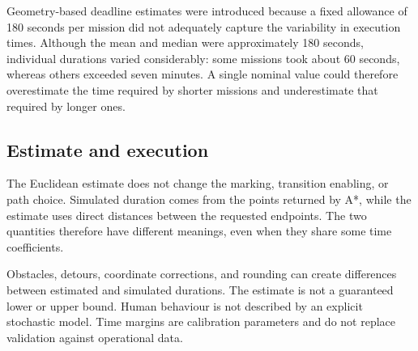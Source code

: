 \begin{nota}
	Geometry-based deadline estimates were introduced because a fixed
	allowance of 180 seconds per mission did not adequately capture
	the variability in execution times. Although the mean and median
	were approximately 180 seconds, individual durations varied
	considerably: some missions took about 60 seconds, whereas others
	exceeded seven minutes. A single nominal value could therefore
	overestimate the time required by shorter missions and underestimate
	that required by longer ones.
\end{nota}

\subsection{Estimate and execution}

The Euclidean estimate does not change the marking, transition enabling, or
path choice. Simulated duration comes from the points returned by A*, while
the estimate uses direct distances between the requested endpoints. The two
quantities therefore have different meanings, even when they share some time
coefficients.

Obstacles, detours, coordinate corrections, and rounding can create differences
between estimated and simulated durations. The estimate is not a guaranteed
lower or upper bound. Human behaviour is not described by an explicit stochastic
model. Time margins are calibration parameters and do not replace validation
against operational data.

